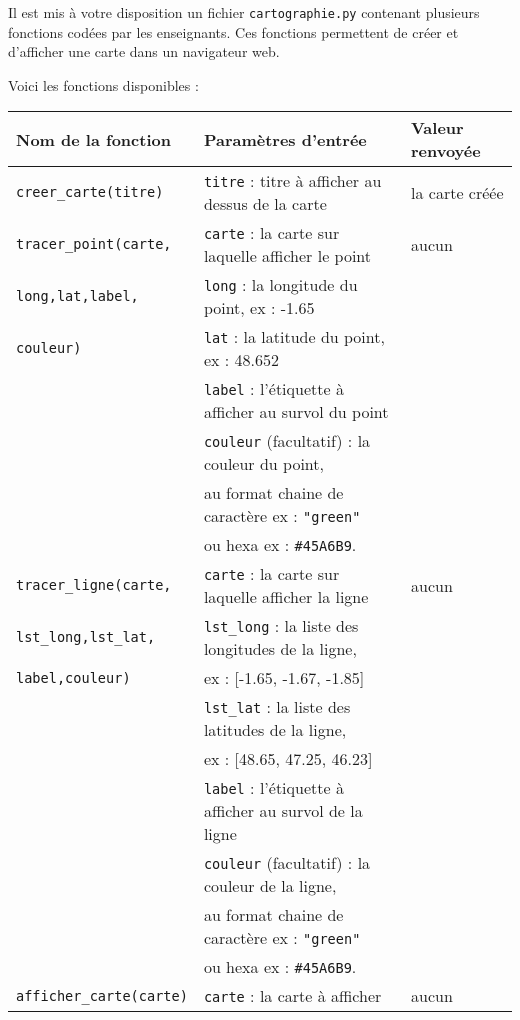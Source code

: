 \documentclass[11pt,a4paper]{article}
\begin{document}
Il est mis à votre disposition un fichier \verb+cartographie.py+ contenant plusieurs fonctions codées par les enseignants. 
Ces fonctions permettent de créer et d'afficher une carte dans un navigateur web.

Voici les fonctions disponibles : 

\vspace{1em}

\begin{tabular}{|l|l|l|}
    \hline
    Nom de la fonction & Paramètres d'entrée & Valeur renvoyée \\
    \hline
    \verb+creer_carte(titre)+ & \verb+titre+ : titre à afficher au dessus de la carte & la carte créée \\
    \hline
    \verb+tracer_point(carte,+ &\verb+carte+ : la carte sur laquelle afficher le point & aucun \\
    \verb+long,lat,label,+& \verb+long+ : la longitude du point, ex : -1.65 & \\
    \verb+couleur)+& \verb+lat+ : la latitude du point, ex : 48.652 & \\
    & \verb+label+ : l'étiquette à afficher au survol du point & \\
    & \verb+couleur+ (facultatif) : la couleur du point, &\\
    &au format chaine de caractère ex : \verb+"green"+ &\\
    & ou hexa ex : \verb+#45A6B9+.&\\  
    \hline
    \verb+tracer_ligne(carte,+ &\verb+carte+ : la carte sur laquelle afficher la ligne & aucun \\
    \verb+lst_long,lst_lat,+& \verb+lst_long+ : la liste des longitudes de la ligne, &\\
    \verb+label,couleur)+& \hspace{2cm} ex : [-1.65, -1.67, -1.85] & \\
    & \verb+lst_lat+ : la liste des latitudes de la ligne,  & \\
    & \hspace{2cm} ex : [48.65, 47.25, 46.23] & \\
    & \verb+label+ : l'étiquette à afficher au survol de la ligne & \\
    & \verb+couleur+ (facultatif) : la couleur de la ligne, &\\
    &au format chaine de caractère ex : \verb+"green"+ &\\
    & ou hexa ex : \verb+#45A6B9+.&\\ 
    \hline
    \verb+afficher_carte(carte)+ &\verb+carte+ : la carte à afficher & aucun \\ 
    \hline
\end{tabular}
\end{document}

